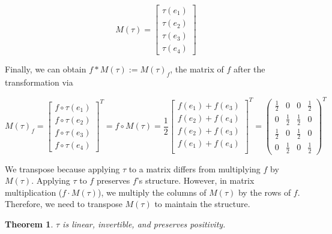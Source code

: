 \documentclass[11pt]{amsart}
\newtheorem{thm}{Theorem}[section]
\theoremstyle{definition}
\begin{document}
\[
M(\tau) = \begin{bmatrix}
\tau(e_1) \\
\tau(e_2) \\
\tau(e_3) \\
\tau(e_4)
\end{bmatrix}
\]

Finally, we can obtain $f * M(\tau) := M(\tau)_f$, the matrix of $f$ after the transformation via

\[
M(\tau)_f = \begin{bmatrix}
f \circ \tau(e_1) \\
f \circ \tau(e_2) \\
f \circ \tau(e_3) \\
f \circ \tau(e_4)
\end{bmatrix}^T = 
f \circ M(\tau) = 
\frac{1}{2}\begin{bmatrix}
f(e_1) + f(e_3) \\
f(e_2) + f(e_4) \\
f(e_2) + f(e_3) \\
f(e_1) + f(e_4) \\
\end{bmatrix}^T = \begin{pmatrix}
\frac{1}{2} & 0 & 0 & \frac{1}{2} \\
0 & \frac{1}{2} & \frac{1}{2} & 0 \\
\frac{1}{2} & 0 & \frac{1}{2} & 0 \\
0 & \frac{1}{2} & 0 & \frac{1}{2}
\end{pmatrix}^T
\]

We transpose because applying $\tau$ to a matrix differs from multiplying $f$ by $M(\tau)$. Applying $\tau$ to $f$ preserves $f$'s structure. However, in matrix multiplication ($f \cdot M(\tau)$), we multiply the columns of $M(\tau)$ by the rows of $f$. Therefore, we need to transpose $M(\tau)$ to maintain the structure.

\begin{thm}
    \(\tau\) is linear, invertible, and preserves positivity.
\end{thm}
\end{document}
